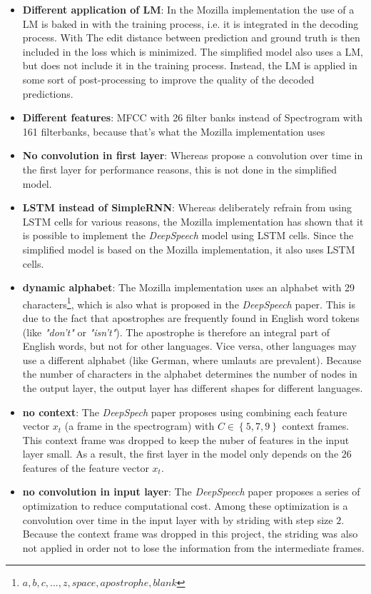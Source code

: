 \begin{itemize}
	\item \textbf{Different application of LM}: In the Mozilla implementation the use of a \ac{LM} is baked in with the training process, i.e. it is integrated in the decoding process. With The edit distance between prediction and ground truth is then included in the loss which is minimized. The simplified model also uses a \ac{LM}, but does not include it in the training process. Instead, the \ac{LM} is applied in some sort of post-processing to improve the quality of the decoded predictions.
	\item \textbf{Different features}: MFCC with 26 filter banks instead of Spectrogram with 161 filterbanks, because that's what the Mozilla implementation uses
	\item \textbf{No convolution in first layer}: Whereas \cite{ctc_paper} propose a convolution over time in the first layer for performance reasons, this is not done in the simplified model.
	\item \textbf{LSTM instead of SimpleRNN}: Whereas \cite{ctc_paper} deliberately refrain from using \ac{LSTM} cells for various reasons, the Mozilla implementation has shown that it is possible to implement the \textit{DeepSpeech} model using \ac{LSTM} cells. Since the simplified model is based on the Mozilla implementation, it also uses \ac{LSTM} cells.
	\item \textbf{dynamic alphabet}: The Mozilla implementation uses an alphabet with 29 characters\footnote{${a,b,c,...,z, space, apostrophe, blank}$}, which is also what is proposed in the \textit{DeepSpeech} paper. This is due to the fact that apostrophes are frequently found in English word tokens (like \textit{"don't"} or \textit{"isn't"}). The apostrophe is therefore an integral part of English words, but not for other languages. Vice versa, other languages may use a different alphabet (like German, where umlauts are prevalent). Because the number of characters in the alphabet determines the number of nodes in the output layer, the output layer has different shapes for different languages.
	\item \textbf{no context}: The \textit{DeepSpech} paper proposes using combining each feature vector $x_t$ (a frame in the spectrogram) with $C \in \left\{ 5,7,9 \right\}$ context frames. This context frame was dropped to keep the nuber of features in the input layer small. As a result, the first layer in the model only depends on the $26$ features of the feature vector $x_t$.
	\item \textbf{no convolution in input layer}: The \textit{DeepSpeech} paper proposes a series of optimization to reduce computational cost. Among these optimization is a convolution over time in the input layer with by striding with step size $2$. Because the context frame was dropped in this project, the striding was also not applied in order not to lose the information from the intermediate frames.
\end{itemize}


